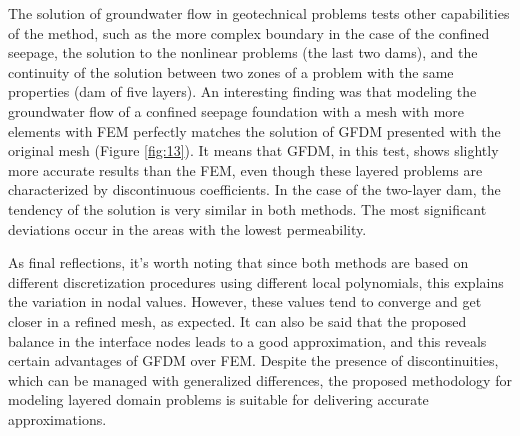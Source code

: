 \documentclass[a4paper,fleqn]{cas-sc}
\begin{document}
The solution of groundwater flow in geotechnical problems tests other capabilities of the method, such as the more complex boundary in the case of the confined seepage, the solution to the nonlinear problems (the last two dams), and the continuity of the solution between two zones of a problem with the same properties (dam of five layers). An interesting finding was that modeling the groundwater flow of a confined seepage foundation with a mesh with more elements with FEM perfectly matches the solution of GFDM presented with the original mesh (Figure \ref{fig:13}). It means that GFDM, in this test, shows slightly more accurate results than the FEM, {even though these layered problems are characterized by discontinuous coefficients.} In the case of the two-layer dam, the tendency of the solution is very similar in both methods. The most significant deviations occur in the areas with the lowest permeability.  

As final reflections, it's worth noting that since both methods are based on different discretization procedures using different local polynomials, this explains the variation in nodal values. However, these values tend to converge and get closer in a refined mesh, as expected. It can also be said that the proposed balance in the interface nodes leads to a good approximation, and this reveals certain advantages of GFDM over FEM. Despite the presence of discontinuities, which can be managed with generalized differences, the proposed methodology for modeling layered domain problems is suitable for delivering accurate approximations.



\end{document}
